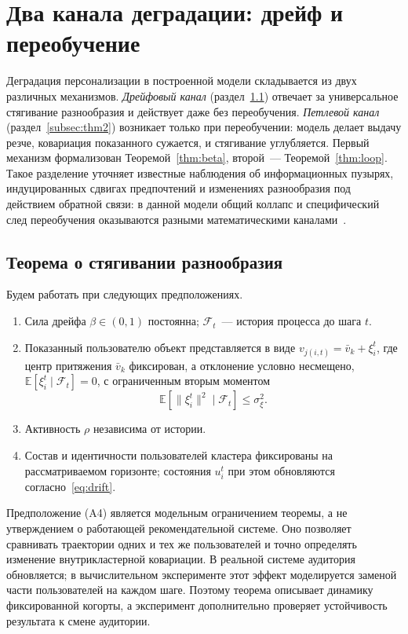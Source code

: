 \section{Два канала деградации: дрейф и переобучение}
\label{sec:Chapter3} 

Деградация персонализации в построенной модели складывается из двух различных
механизмов. \emph{Дрейфовый канал} (раздел~\ref{subsec:thm1}) отвечает за
универсальное стягивание разнообразия и действует даже без переобучения.
\emph{Петлевой канал} (раздел~\ref{subsec:thm2}) возникает только при
переобучении: модель делает выдачу резче, ковариация показанного сужается, и
стягивание углубляется. Первый механизм формализован Теоремой~\ref{thm:beta},
второй~--- Теоремой~\ref{thm:loop}. Такое разделение уточняет известные
наблюдения об информационных пузырях, индуцированных сдвигах предпочтений и
изменениях разнообразия под действием обратной связи: в данной модели общий
коллапс и специфический след переобучения оказываются разными математическими
каналами~\cite{nguyen2014, jiang2019,
carroll2022, barlacchi2026diversityParadox}.

\subsection{Теорема о стягивании разнообразия}
\label{subsec:thm1}

Будем работать при следующих предположениях.
\begin{enumerate}[label=\textup{(A\arabic*)}, leftmargin=2.4em]
    \item Сила дрейфа $\beta\in(0,1)$ постоянна; $\mathcal F_t$~--- история
    процесса до шага $t$.
    \item Показанный пользователю объект представляется в виде
    $v_{j(i,t)}=\bar v_k+\xi_i^t$, где центр притяжения $\bar v_k$ фиксирован, а
    отклонение условно несмещено,
    $\mathbb E[\xi_i^t\mid\mathcal F_t]=0$, с ограниченным вторым моментом
    \[
        \mathbb E[\lVert\xi_i^t\rVert^2\mid\mathcal F_t]\le\sigma_\xi^2.
    \]
    \item Активность $\rho$ независима от истории.
    \item Состав и идентичности пользователей кластера фиксированы на
    рассматриваемом горизонте; состояния $u_i^t$ при этом обновляются
    согласно~\eqref{eq:drift}.
\end{enumerate}

Предположение \textup{(A4)} является модельным ограничением теоремы, а не
утверждением о работающей рекомендательной системе. Оно позволяет сравнивать
траектории одних и тех же пользователей и точно определять изменение
внутрикластерной ковариации. В реальной системе аудитория обновляется; в
вычислительном эксперименте этот эффект моделируется заменой части пользователей
на каждом шаге. Поэтому теорема описывает динамику фиксированной когорты, а
эксперимент дополнительно проверяет устойчивость результата к смене аудитории.

